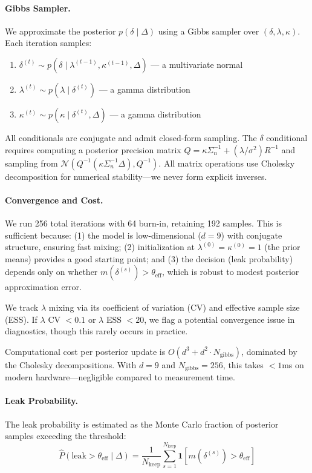 \paragraph{Gibbs Sampler.}
We approximate the posterior $p(\delta \mid \Delta)$ using a Gibbs sampler over $(\delta, \lambda, \kappa)$. Each iteration samples:
\begin{enumerate}
\item $\delta^{(t)} \sim p(\delta \mid \lambda^{(t-1)}, \kappa^{(t-1)}, \Delta)$ --- a multivariate normal
\item $\lambda^{(t)} \sim p(\lambda \mid \delta^{(t)})$ --- a gamma distribution
\item $\kappa^{(t)} \sim p(\kappa \mid \delta^{(t)}, \Delta)$ --- a gamma distribution
\end{enumerate}

All conditionals are conjugate and admit closed-form sampling. The $\delta$ conditional requires computing a posterior precision matrix $Q = \kappa \Sigma_n^{-1} + (\lambda/\sigma^2) R^{-1}$ and sampling from $\mathcal{N}(Q^{-1}(\kappa \Sigma_n^{-1} \Delta), Q^{-1})$. All matrix operations use Cholesky decomposition for numerical stability---we never form explicit inverses.

\paragraph{Convergence and Cost.}
We run 256 total iterations with 64 burn-in, retaining 192 samples. This is sufficient because: (1) the model is low-dimensional ($d=9$) with conjugate structure, ensuring fast mixing; (2) initialization at $\lambda^{(0)} = \kappa^{(0)} = 1$ (the prior means) provides a good starting point; and (3) the decision (leak probability) depends only on whether $m(\delta^{(s)}) > \theta_{\text{eff}}$, which is robust to modest posterior approximation error.

We track $\lambda$ mixing via its coefficient of variation (CV) and effective sample size (ESS). If $\lambda$ CV $< 0.1$ or $\lambda$ ESS $< 20$, we flag a potential convergence issue in diagnostics, though this rarely occurs in practice.

Computational cost per posterior update is $O(d^3 + d^2 \cdot N_{\text{gibbs}})$, dominated by the Cholesky decompositions. With $d=9$ and $N_{\text{gibbs}}=256$, this takes $<1$ms on modern hardware---negligible compared to measurement time.

\paragraph{Leak Probability.}
The leak probability is estimated as the Monte Carlo fraction of posterior samples exceeding the threshold:
\begin{equation}
\widehat{P}(\text{leak} > \theta_{\text{eff}} \mid \Delta) = \frac{1}{N_{\text{keep}}} \sum_{s=1}^{N_{\text{keep}}} \mathbf{1}\!\left[m(\delta^{(s)}) > \theta_{\text{eff}}\right]
\end{equation}

